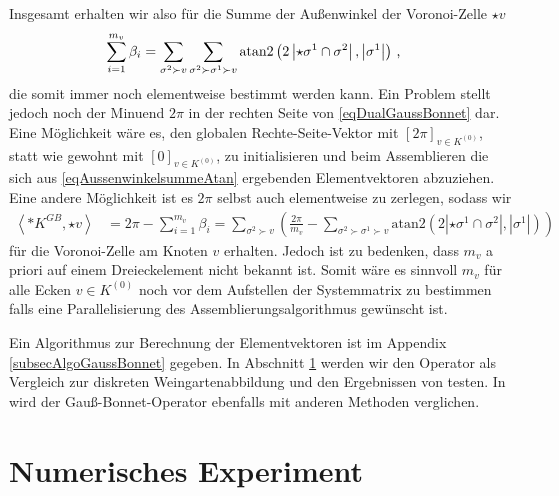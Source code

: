     Insgesamt erhalten wir also für die Summe der Außenwinkel der Voronoi-Zelle \( \star v \)
    \begin{align}
      \label{eqAussenwinkelsummeAtan}
      \sum_{i=1}^{m_{v}}\beta_{i} &= \sum_{\sigma^{2}\succ v} \sum_{\sigma^{2}\succ\sigma^{1}\succ v}
                               \text{atan2}\left( 2\left|\star\sigma^{1} \cap \sigma^{2} \right|, 
                                 \left|\sigma^{1}\right|\right) \,\text{,}       
    \end{align}
    die somit immer noch elementweise bestimmt werden kann.
    Ein Problem stellt jedoch noch der Minuend \( 2\pi \) in der rechten Seite von \ref{eqDualGaussBonnet} dar.
    Eine Möglichkeit wäre es, den globalen Rechte-Seite-Vektor mit \( \left[ 2\pi \right]_{v\in K^{(0)}} \), statt wie
    gewohnt mit \( \left[ 0 \right]_{v\in K^{(0)}} \), zu initialisieren und beim Assemblieren die sich aus 
    \eqref{eqAussenwinkelsummeAtan} ergebenden Elementvektoren abzuziehen.
    Eine andere Möglichkeit ist es \( 2\pi \) selbst auch elementweise zu zerlegen, sodass wir
    \begin{align}
      \label{eqProbGB}
      \left\langle *K^{GB} , \star v \right\rangle &=
      2\pi - \sum_{i=1}^{m_{v}}\beta_{i} =
          \sum_{\sigma^{2}\succ v} \left( \frac{2\pi}{m_{v}} - \sum_{\sigma^{2}\succ\sigma^{1}\succ v}
                               \text{atan2}\left( 2\left|\star\sigma^{1} \cap \sigma^{2} \right|, 
                                 \left|\sigma^{1}\right|\right) \right)
    \end{align}
    für die Voronoi-Zelle am Knoten \( v \) erhalten. 
    Jedoch ist zu bedenken, dass \( m_{v} \) a priori auf einem Dreieckelement nicht bekannt ist.
    Somit wäre es sinnvoll \( m_{v} \) für alle Ecken \( v\in K^{(0)} \) noch vor dem Aufstellen der Systemmatrix zu bestimmen falls eine
    Parallelisierung des Assemblierungsalgorithmus gewünscht ist.

    Ein Algorithmus zur Berechnung der Elementvektoren ist im Appendix \ref{subsecAlgoGaussBonnet} gegeben.
    In Abschnitt \ref{secNumEx} werden wir den Operator als Vergleich zur diskreten Weingartenabbildung und den Ergebnissen von \cite{heine} testen. 
    In \cite{meyer} wird der Gauß-Bonnet-Operator ebenfalls mit anderen Methoden verglichen.

\section{Numerisches Experiment}
\label{secNumEx}
  
